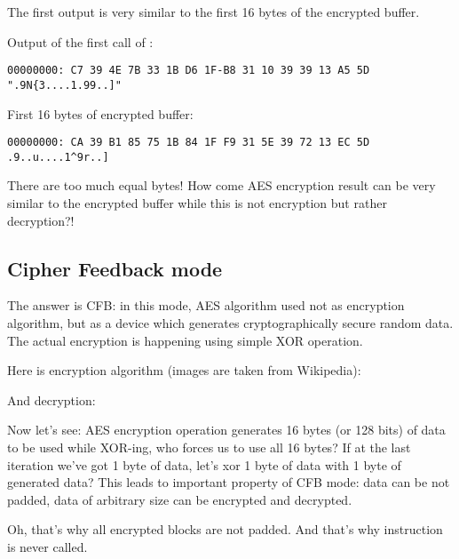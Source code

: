 The first output is very similar to the first 16 bytes of the encrypted buffer.

Output of the first call of :

\begin{lstlisting}
00000000: C7 39 4E 7B 33 1B D6 1F-B8 31 10 39 39 13 A5 5D ".9N{3....1.99..]"
\end{lstlisting}

First 16 bytes of encrypted buffer:

\begin{lstlisting}
00000000: CA 39 B1 85 75 1B 84 1F F9 31 5E 39 72 13 EC 5D  .9..u....1^9r..]
\end{lstlisting}

There are too much equal bytes!
How come AES encryption result can be very similar to the encrypted buffer while this is not
encryption but rather decryption?!

\subsection{Cipher Feedback mode}

The answer is \ac{CFB}:
in this mode, AES algorithm used not as encryption algorithm, but as a device which generates cryptographically secure random data.
The actual encryption is happening using simple XOR operation.

Here is encryption algorithm (images are taken from Wikipedia):

\begin{figure}[H]
\centering
{}
\end{figure}

And decryption:

\begin{figure}[H]
\centering
{}
\label{fig:CFB_decryption}
\end{figure}

Now let's see: AES encryption operation generates 16 bytes (or 128 bits) of  data
to be used while XOR-ing, who forces us to use all 16 bytes?
If at the last iteration we've got 1 byte of data, let's xor 1 byte of data with 1 byte of generated
 data?
This leads to important property of \ac{CFB} mode: data can be not padded, data of arbitrary size
can be encrypted and decrypted.

Oh, that's why all encrypted blocks are not padded.
And that's why  instruction is never called.

